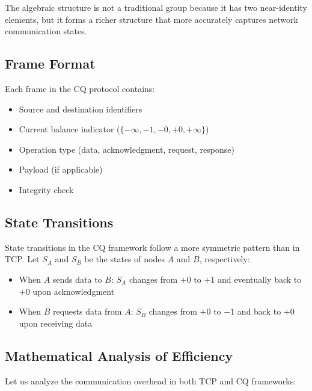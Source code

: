 \documentclass[../OAE-SPEC-MAIN.tex]{subfiles}
\begin{document}
The algebraic structure is not a traditional group because it has two near-identity elements, but it forms a richer structure that more accurately captures network communication states.


\subsection{Frame Format}

Each frame in the CQ protocol contains:

\begin{itemize}
    \item Source and destination identifiers
    \item Current balance indicator ($\{-\infty, -1, -0, +0, +\infty\}$)
    \item Operation type (data, acknowledgment, request, response)
    \item Payload (if applicable)
    \item Integrity check
\end{itemize}

\subsection{State Transitions}

State transitions in the CQ framework follow a more symmetric pattern than in TCP. Let $S_A$ and $S_B$ be the states of nodes $A$ and $B$, respectively:

\begin{itemize}
    \item When $A$ sends data to $B$: $S_A$ changes from $+0$ to $+1$ and eventually back to $+0$ upon acknowledgment
    \item When $B$ requests data from $A$: $S_B$ changes from $+0$ to $-1$ and back to $+0$ upon receiving data
\end{itemize}

\subsection{Mathematical Analysis of Efficiency}

Let us analyze the communication overhead in both TCP and CQ frameworks:
\end{document}
